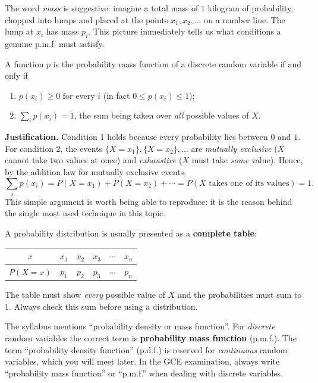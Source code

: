\documentclass[11pt]{article}
\begin{document}
The word \emph{mass} is suggestive: imagine a total mass of $1$ kilogram of probability, chopped into lumps and placed at the points $x_1, x_2, \dots$ on a number line. The lump at $x_i$ has mass $p_i$. This picture immediately tells us what conditions a genuine p.m.f. must satisfy.

\begin{propriete}
A function $p$ is the probability mass function of a discrete random variable if and only if
\begin{enumerate}
\item $p(x_i) \geq 0$ for every $i$ (in fact $0 \leq p(x_i) \leq 1$);
\item $\displaystyle\sum_{i} p(x_i) = 1$, the sum being taken over \emph{all} possible values of $X$.
\end{enumerate}
\end{propriete}

\textbf{Justification.} Condition 1 holds because every probability lies between $0$ and $1$. For condition 2, the events $\{X = x_1\}, \{X = x_2\}, \dots$ are \emph{mutually exclusive} ($X$ cannot take two values at once) and \emph{exhaustive} ($X$ must take \emph{some} value). Hence, by the addition law for mutually exclusive events,
\[ \sum_i p(x_i) = P(X = x_1) + P(X = x_2) + \cdots = P(X \text{ takes one of its values}) = 1. \]
This simple argument is worth being able to reproduce: it is the reason behind the single most used technique in this topic.

\begin{aretenir}
A probability distribution is usually presented as a \textbf{complete table}:
\begin{center}
\begin{tabular}{|c|ccccc|}
\hline
\rowcolor{popblueL} $x$ & $x_1$ & $x_2$ & $x_3$ & $\cdots$ & $x_n$ \\ \hline
$P(X = x)$ & $p_1$ & $p_2$ & $p_3$ & $\cdots$ & $p_n$ \\ \hline
\end{tabular}
\end{center}
The table must show \emph{every} possible value of $X$ and the probabilities must sum to $1$. Always check this sum before using a distribution.
\end{aretenir}

\begin{savaistu}
The syllabus mentions ``probability density or mass function''. For \emph{discrete} random variables the correct term is \textbf{probability mass function} (p.m.f.). The term ``probability density function'' (p.d.f.) is reserved for \emph{continuous} random variables, which you will meet later. In the GCE examination, always write ``probability mass function'' or ``p.m.f.'' when dealing with discrete variables.
\end{savaistu}
\end{document}
